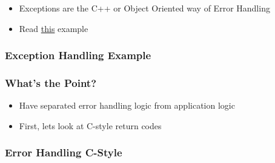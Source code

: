 \begin{itemize}
\itemsep1pt\parskip0pt
\item
  Exceptions are the C++ or Object Oriented way of Error Handling
\item
  Read
  \href{https://msdn.microsoft.com/en-us/library/hh279678.aspx}{this}
  example
\end{itemize}

\subsubsection{Exception Handling
Example}\label{exception-handling-example}

\begin{Shaded}
\begin{Highlighting}[]
  \NormalTok{; \}}

 
\NormalTok{\{}
  \NormalTok{\{}
     \NormalTok{;}
     
    \NormalTok{\{}
       \NormalTok{);}
    \NormalTok{\}}
  \NormalTok{\}}
   
  \NormalTok{\{}
     
  \NormalTok{\}}
\NormalTok{\}}

\end{Highlighting}
\end{Shaded}

\subsubsection{What's the Point?}\label{whats-the-point}

\begin{itemize}
\itemsep1pt\parskip0pt
\item
  Have separated error handling logic from application logic
\item
  First, lets look at C-style return codes
\end{itemize}

\subsubsection{Error Handling C-Style}\label{error-handling-c-style}

